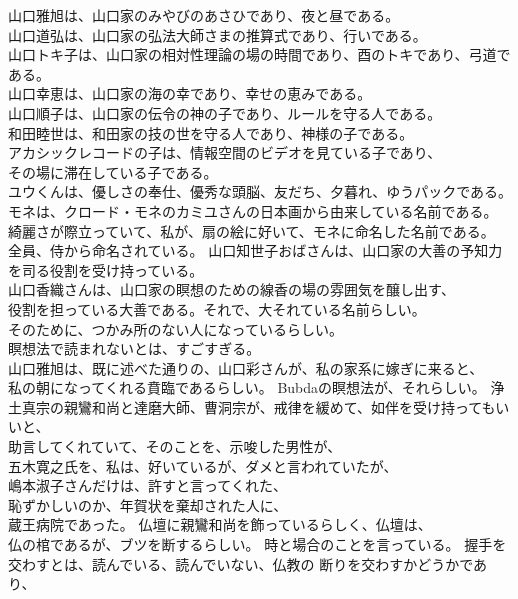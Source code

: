 \documentclass{jsarticle}
\begin{document}
山口雅旭は、山口家のみやびのあさひであり、夜と昼である。\\
山口道弘は、山口家の弘法大師さまの推算式であり、行いである。 \\
山口トキ子は、山口家の相対性理論の場の時間であり、酉のトキであり、弓道である。 \\
山口幸恵は、山口家の海の幸であり、幸せの恵みである。 \\
山口順子は、山口家の伝令の神の子であり、ルールを守る人である。 \\
和田睦世は、和田家の技の世を守る人であり、神様の子である。 \\
アカシックレコードの子は、情報空間のビデオを見ている子であり、 \\
その場に滞在している子である。 \\
ユウくんは、優しさの奉仕、優秀な頭脳、友だち、夕暮れ、ゆうパックである。\\
モネは、クロード・モネのカミユさんの日本画から由来している名前である。 \\
綺麗さが際立っていて、私が、扇の絵に好いて、モネに命名した名前である。\\
全員、侍から命名されている。
山口知世子おばさんは、山口家の大善の予知力を司る役割を受け持っている。 \\
山口香織さんは、山口家の瞑想のための線香の場の雰囲気を醸し出す、 \\
役割を担っている大善である。それで、大それている名前らしい。 \\
そのために、つかみ所のない人になっているらしい。 \\
瞑想法で読まれないとは、すごすぎる。 \\
山口雅旭は、既に述べた通りの、山口彩さんが、私の家系に嫁ぎに来ると、 \\
私の朝になってくれる賁臨であるらしい。
Bubdaの瞑想法が、それらしい。
浄土真宗の親鸞和尚と達磨大師、曹洞宗が、戒律を緩めて、如伴を受け持ってもいいと、\\
助言してくれていて、そのことを、示唆した男性が、\\
五木寛之氏を、私は、好いているが、ダメと言われていたが、 \\
嶋本淑子さんだけは、許すと言ってくれた、\\
恥ずかしいのか、年賀状を棄却された人に、 \\
蔵王病院であった。
仏壇に親鸞和尚を飾っているらしく、仏壇は、\\
仏の棺であるが、ブツを断するらしい。
時と場合のことを言っている。
握手を交わすとは、読んでいる、読んでいない、仏教の
断りを交わすかどうかであり、 \\
\end{document}
